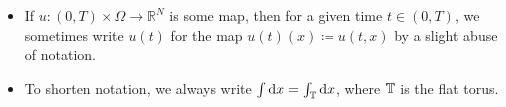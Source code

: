 \begin{itemize}[leftmargin=*]
		\item 
		If $ u \colon ( 0 , T ) \times \Omega \to \mathbb{ R }^{ N } $ is some 
		map, then for a given time $ t \in ( 0 , T ) $, we sometimes write $ 
		u ( t ) $ for the map $ u ( t ) ( x ) \coloneqq u ( t , x ) $ by a 
		slight abuse of notation.
		
		\item
		To shorten notation, we always write $ \int \dd{ x } = \int_{ 
		\operatorname{\mathbb{T}} } \dd{ x } $, where $ \operatorname{\mathbb{T}} $ is the flat torus.
	\end{itemize}
